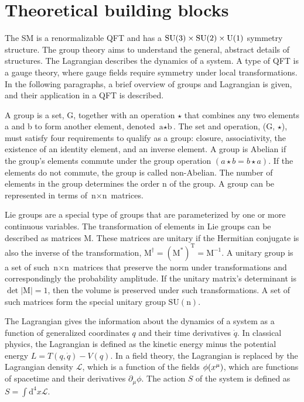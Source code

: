 \section{Theoretical building blocks}
The SM is a renormalizable QFT and has a $\text{SU}(3) \times \text{SU}(2) \times \text{U}(1)$ symmetry structure. The group theory aims to understand the general, abstract details of structures. The Lagrangian describes the dynamics of a system. A type of QFT is a gauge theory, where gauge fields require symmetry under local transformations. In the following paragraphs, a brief overview of groups and Lagrangian is given, and their application in a QFT is described.

A group is a set, G, together with an operation $\star$ that combines any two elements a and b to form another element, denoted $\text{a} \star \text{b}$. The set and operation, (G, $\star$), must satisfy four requirements to qualify as a group: closure, associativity, the existence of an identity element, and an inverse element. A group is Abelian if the group's elements commute under the group operation $(a \star b = b \star a)$. If the elements do not commute, the group is called non-Abelian. The number of elements in the group determines the order n of the group. A group can be represented in terms of $\text{n} \times \text{n}$ matrices.

Lie groups are a special type of groups that are parameterized by one or more continuous variables. The transformation of elements in Lie groups can be described as matrices M. These matrices are unitary if the Hermitian conjugate is also the inverse of the transformation, $\text{M}^{\dagger}=(\text{M}^{*})^{\text{T}}=\text{M}^{-1}$. A unitary group is a set of such $\text{n} \times \text{n}$ matrices that preserve the norm under transformations and correspondingly the probability amplitude. If the unitary matrix's determinant is $\operatorname{det}|\text{M}|=1$, then the volume is preserved under such transformations. A set of such matrices form the special unitary group $\text{SU}(\text{n})$.

The Lagrangian gives the information about the dynamics of a system as a function of generalized coordinates $q$ and their time derivatives $\dot{q}$. In classical physics, the Lagrangian is defined as the kinetic energy minus the potential energy $L=T(q, \dot{q})-V(q)$. In a field theory, the Lagrangian is replaced by the Lagrangian density $\mathcal{L}$, which is a function of the fields $\phi(x^{\mu})$, which are functions of spacetime and their derivatives $\partial_{\mu} \phi$. The action $S$ of the system is defined as $S=\int \text{d}^{4} x \mathcal{L}$.

